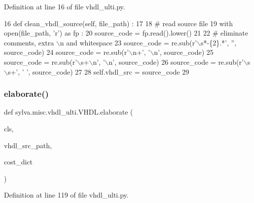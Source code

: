 Definition at line 16 of file vhdl\+\_\+ulti.\+py.


\begin{DoxyCode}
16   \textcolor{keyword}{def }clean\_vhdl\_source(self, file\_path) :
17 
18     \textcolor{comment}{# read source file}
19     with open(file\_path, \textcolor{stringliteral}{'r') as fp :}
20 \textcolor{stringliteral}{      source\_code = fp.read().lower()}
21 \textcolor{stringliteral}{}
22 \textcolor{stringliteral}{    }\textcolor{comment}{# eliminate comments, extra \(\backslash\)n and whitespace}
23     source\_code = re.sub(\textcolor{stringliteral}{r'\(\backslash\)s*-\{2\}.*'}, \textcolor{stringliteral}{''}, source\_code)
24     source\_code = re.sub(\textcolor{stringliteral}{r'\(\backslash\)n+'}, \textcolor{stringliteral}{'\(\backslash\)n'}, source\_code)
25     source\_code = re.sub(\textcolor{stringliteral}{r'\(\backslash\)s+\(\backslash\)n'}, \textcolor{stringliteral}{'\(\backslash\)n'}, source\_code)
26     source\_code = re.sub(\textcolor{stringliteral}{r'\(\backslash\)s\(\backslash\)s+'}, \textcolor{stringliteral}{' '}, source\_code)
27 
28     self.vhdl\_src = source\_code
29 
\end{DoxyCode}
\mbox{\label{classsylva_1_1misc_1_1vhdl__ulti_1_1_v_h_d_l_a4e4bd98f12b587f047259934db24a2b2}} 
\subsubsection{\texorpdfstring{elaborate()}{elaborate()}}
{\footnotesize\ttfamily def sylva.\+misc.\+vhdl\+\_\+ulti.\+V\+H\+D\+L.\+elaborate (\begin{DoxyParamCaption}\item[{}]{cls,  }\item[{}]{vhdl\+\_\+src\+\_\+path,  }\item[{}]{cost\+\_\+dict }\end{DoxyParamCaption})}



Definition at line 119 of file vhdl\+\_\+ulti.\+py.


